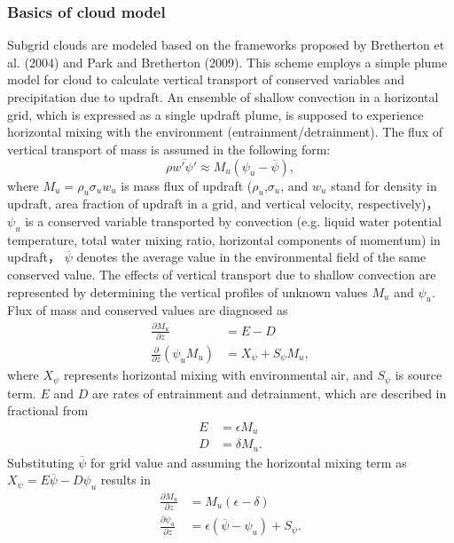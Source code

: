 \subsubsection{Basics of cloud model}\label{basics-of-cloud-model}
Subgrid clouds are modeled based on the frameworks proposed by Bretherton et al. (2004) and Park and Bretherton (2009).
This scheme employs a simple plume model for cloud to calculate vertical transport of conserved variables and precipitation due to updraft.
An ensemble of shallow convection in a horizontal grid, which is expressed as a single updraft plume, is supposed to experience horizontal mixing with the environment
(entrainment/detrainment). The flux of vertical transport of mass is assumed in the following form:
\begin{equation}\label{def_Mu}
    \rho \overline {w' \psi '}\approx M_u (\psi_u-\overline{\psi}) ,
\end{equation}
where $M_u=\rho_u\sigma_u w_u$ is mass flux of updraft ($\rho_u$,$\sigma_u$, and $w_u$ stand for density in updraft, area fraction of updraft in a grid, and vertical velocity, respectively)，
$\psi_u$ is a conserved variable transported by convection (e.g. liquid water potential temperature, total water mixing ratio, horizontal components of momentum) in updraft，
$\overline{\psi}$ denotes the average value in the environmental field of the same conserved value.
The effects of vertical transport due to shallow convection are represented by determining the vertical profiles of unknown values $M_u$ and $\psi_u$.
Flux of mass and conserved values are diagnosed as
\begin{align}
    \frac{\partial M_u}{\partial z} &= E - D \label{zprof_Mu}\\
    \frac{\partial}{\partial z} (\psi_u M_u) &= X_\psi + S_\psi M_u,\label{zprof_psi}
\end{align}
where $X_\psi$ represents horizontal mixing with environmental air, and $S_\psi$ is source term. $E$ and $D$ are rates of entrainment and detrainment, which are described in fractional from
\begin{align}
    E &=\epsilon M_u \label{fracE}\\
    D &=\delta M_u. \label{fracD}
\end{align}
Substituting $\overline{\psi}$ for grid value and assuming the horizontal mixing term as $X_{\psi}=E \overline{\psi} - D\psi_u$ results in
\begin{align}
    \frac{\partial M_u}{\partial z} &= M_u (\epsilon - \delta) \label{zprof_Mu'}\\
    \frac{\partial \psi_u}{\partial z} &= \epsilon(\overline{\psi} - \psi_u) + S_{\psi}. \label{zprof_psi'}
\end{align}

